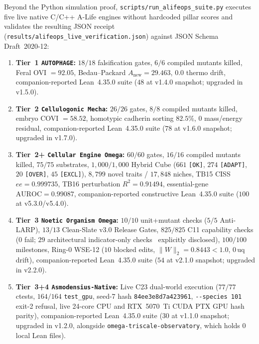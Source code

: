 \documentclass[11pt,reqno]{amsart}
\theoremstyle{plain}
\theoremstyle{definition}
\theoremstyle{remark}
\newcommand{\code}[1]{{\footnotesize\nolinkurl{#1}}}
\begin{document}
Beyond the Python simulation proof, \code{scripts/run_alifeops_suite.py} executes five live native C/C++ A-Life engines without hardcoded pillar scores and validates the resulting JSON receipt (\code{results/alifeops_live_verification.json}) against JSON Schema Draft~2020-12:
\begin{enumerate}[leftmargin=1.5em]
  \item \textbf{Tier~1 \code{AUTOPHAGE}:} $18/18$ falsification gates, $6/6$ compiled mutants killed, Feral OVI $= 92.05$, Bedau--Packard $A_{\mathrm{new}} = 29.463$, $0.0$ thermo drift, companion-reported Lean~4.35.0 suite ($48$ at v1.4.0 snapshot; upgraded in v1.5.0).
  \item \textbf{Tier~2 \code{Cellulogonic Mecha}:} $26/26$ gates, $8/8$ compiled mutants killed, embryo COVI $= 58.52$, homotypic cadherin sorting $82.5\%$, $0$ mass/energy residual, companion-reported Lean~4.35.0 suite ($78$ at v1.6.0 snapshot; upgraded in v1.7.0).
  \item \textbf{Tier~2+ \code{Cellular Engine Omega}:} $60/60$ gates, $16/16$ compiled mutants killed, $75/75$ substrates, $1{,}000/1{,}000$ Hybrid Cube ($661$ \code{[OK]}, $274$ \code{[ADAPT]}, $20$ \code{[OVER]}, $45$ \code{[EXCL]}), $8{,}799$ novel traits / $17{,}848$ niches, TB15 CISS $ee = 0.999735$, TB16 perturbation $R^2 = 0.91494$, essential-gene $\mathrm{AUROC} = 0.99087$, companion-reported constructive Lean~4.35.0 suite ($100$ at v5.3.0/v5.4.0).
  \item \textbf{Tier~3 \code{Noetic Organism Omega}:} $10/10$ unit+mutant checks ($5/5$ Anti-LARP), $13/13$ Clean-Slate v3.0 Release Gates, $825/825$ C11 capability checks ($0$ fail; $29$ architectural indicator-only checks~\cite{butlin2023consciousness} explicitly disclosed), $100/100$ milestones, Ring-0 WSE-12 ($10$ blocked edits, $\|W\|_2 = 0.8443 < 1.0$, $0\,\text{uq}$ drift), companion-reported Lean~4.35.0 suite ($54$ at v2.1.0 snapshot; upgraded in v2.2.0).
  \item \textbf{Tier~3+4 \code{Asmodensius-Native}:} Live C23 dual-world execution ($77/77$ ctests, $164/164$ \code{test_gpu}, seed-7 hash \code{84ee3e8d7a423961}, \code{--species 101} exit-2 refusal, live 24-core CPU and RTX~5070~Ti CUDA PTX GPU hash parity), companion-reported Lean~4.35.0 suite ($30$ at v1.1.0 snapshot; upgraded in v1.2.0, alongside \code{omega-triscale-observatory}, which holds $0$ local Lean files).
\end{enumerate}
\end{document}
